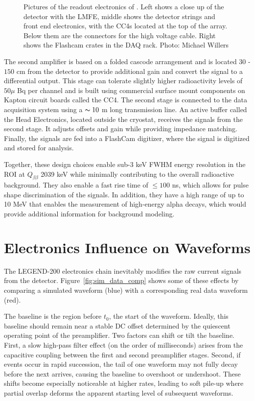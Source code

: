 \begin{figure}[!htb]
    \caption{Pictures of the readout electronics of {\Ltwo}. Left shows a close up of the detector with the LMFE, middle shows the detector strings and front end electronics, with the CC4s located at the top of the array. Below them are the connectors for the high voltage cable. Right shows the Flashcam crates in the DAQ rack. Photo: Michael Willers}
   \label{ch6_fig_l200_elec_model_real}
\end{figure}


The second amplifier is based on a folded cascode arrangement and is located $30$ -$150$ cm from the detector to provide additional gain and convert the signal to a differential output. This stage can tolerate slightly higher radioactivity levels of $50\mu$ Bq per channel and is built using commercial surface mount components on Kapton circuit boards called the CC4. The second stage is connected to the data acquisition system using a $\thicksim 10$ m long transmission line. An active buffer called the Head Electronics, located outside the cryostat, receives the signals from the second stage. It adjusts offsets and gain while providing impedance matching. Finally, the signals are fed into a FlashCam digitizer, where the signal is digitized and stored for analysis.

Together, these design choices enable sub-3 keV FWHM energy resolution in the ROI at $Q_{\beta\beta}$ 2039 keV while minimally contributing to the overall radioactive background. They also enable a fast rise time of $\leq 100$ ns, which allows for pulse shape discrimination of the signals. In addition, they have a high range of up to 10 MeV that enables the measurement of high-energy alpha decays, which would provide additional information for background modeling.

\section{Electronics Influence on Waveforms}
The LEGEND-200 electronics chain inevitably modifies the raw current signals from the detector. Figure~\ref{fig:sim_data_comp} shows some of these effects by comparing a simulated waveform (blue) with a corresponding real data waveform (red).

The baseline is the region before $t_0$, the start of the waveform. Ideally, this baseline should remain near a stable DC offset determined by the quiescent operating point of the preamplifier. Two factors can shift or tilt the baseline. First, a slow high-pass filter effect (on the order of milliseconds) arises from the capacitive coupling between the first and second preamplifier stages. Second, if events occur in rapid succession, the tail of one waveform may not fully decay before the next arrives, causing the baseline to overshoot or undershoot. These shifts become especially noticeable at higher rates, leading to soft pile-up where partial overlap deforms the apparent starting level of subsequent waveforms. 

